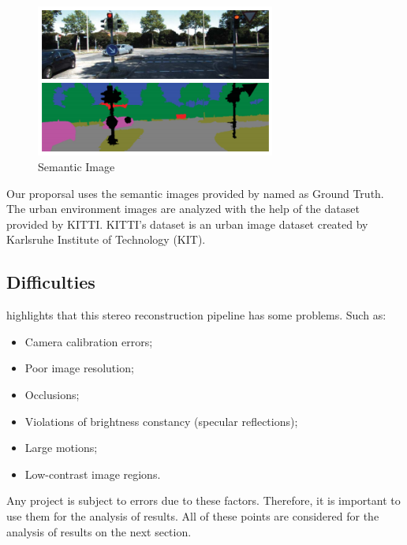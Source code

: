     \begin{figure}[H]
     \caption{\label{fig:semantic01}
Semantic Image}
     \begin{center}
        \includegraphics[width=0.7\textwidth]{images/semantic01.png}
     \end{center}
    \end{figure}    
    
    Our proporsal uses the semantic images provided by \cite{giovaniThesis} named as Ground Truth. The urban environment images are analyzed with the help of the dataset provided by KITTI. KITTI's dataset is an urban image dataset created by Karlsruhe Institute of Technology (KIT).

\subsection{Difficulties}

    \cite{SSD_teste} highlights that this stereo reconstruction pipeline has some problems. Such as:
    
    \begin{itemize}
    \item Camera calibration errors;
    \item Poor image resolution;
    \item Occlusions;
    \item Violations of brightness constancy (specular reflections);
    \item Large motions;
    \item Low-contrast image regions.
\end{itemize}

    Any project is subject to errors due to these factors. Therefore, it is important to use them for the analysis of results. All of these points are considered for the analysis of results on the next section.
    
